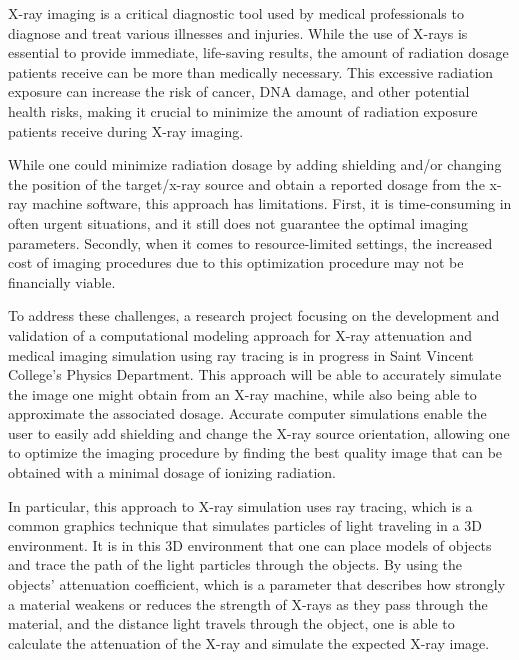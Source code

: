X-ray imaging is a critical diagnostic tool used by medical professionals to diagnose and treat various illnesses and injuries. While the use of X-rays is essential to provide immediate, life-saving results, the amount of radiation dosage patients receive can be more than medically necessary. This excessive radiation exposure can increase the risk of cancer, DNA damage, and other potential health risks, making it crucial to minimize the amount of radiation exposure patients receive during X-ray imaging. \cite{RadiationEffects} 

While one could minimize radiation dosage by adding shielding and/or changing the position of the target/x-ray source and obtain a reported dosage from the x-ray machine software, this approach has limitations. First, it is time-consuming in often urgent situations, and it still does not guarantee the optimal imaging parameters. Secondly, when it comes to resource-limited settings, the increased cost of imaging procedures due to this optimization procedure may not be financially viable.

To address these challenges, a research project focusing on the development and validation of a computational modeling approach for X-ray attenuation and medical imaging simulation using ray tracing is in progress in Saint Vincent College's Physics Department. This approach will be able to accurately simulate the image one might obtain from an X-ray machine, while also being able to approximate the associated dosage. Accurate computer simulations enable the user to easily add shielding and change the X-ray source orientation, allowing one to optimize the imaging procedure by finding the best quality image that can be obtained with a minimal dosage of ionizing radiation.

In particular, this approach to X-ray simulation uses ray tracing, which is a common graphics technique that simulates particles of light traveling in a 3D environment. It is in this 3D environment that one can place models of objects and trace the path of the light particles through the objects. By using the objects' attenuation coefficient, which is a parameter that describes how strongly a material weakens or reduces the strength of X-rays as they pass through the material, and the distance light travels through the object, one is able to calculate the attenuation of the X-ray and simulate the expected X-ray image.

